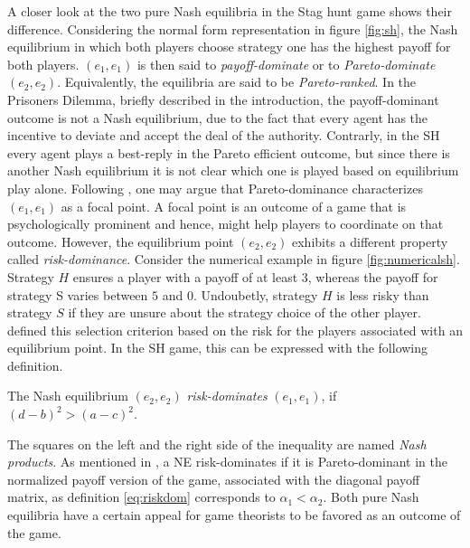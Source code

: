 A closer look at the two pure Nash equilibria in the Stag hunt game 
shows their difference. Considering the normal form representation in figure 
\ref{fig:sh}, the Nash equilibrium in which both players choose strategy one 
has the highest payoff
for both players. $(e_1,e_1)$ is then said to 
\textit{payoff-dominate} or to \textit{Pareto-dominate} 
$(e_2,e_2)$. Equivalently, the equilibria are said to be
\textit{Pareto-ranked}.
In the Prisoners Dilemma, briefly described in the introduction, 
the payoff-dominant outcome is not a 
Nash equilibrium, due to the fact that every agent has the incentive to 
deviate and accept the deal of the authority.
Contrarly, in the SH every agent plays a best-reply 
in the Pareto efficient outcome, but since there is another Nash equilibrium 
it is not clear which one is played based on equilibrium play alone. 
Following \textcite[57]{schelling_strategy_1960}, one may argue that 
Pareto-dominance characterizes $(e_1,e_1)$ as a focal point. 
A focal point is an outcome of a game that is psychologically prominent and
hence, might help players to coordinate on that outcome.
However, the equilibrium point $(e_2,e_2)$ exhibits a different property
called \textit{risk-dominance}. 
Consider the numerical example in figure \ref{fig:numericalsh}. 
Strategy $H$ ensures a player with a payoff of at least $3$, whereas the 
payoff for strategy S varies between $5$ and $0$. Undoubetly, 
strategy $H$ is less risky than strategy $S$ if they are unsure 
about the strategy choice of the other player.
\textcite{harsanyi_general_1988} defined this selection criterion 
based on the risk for the players associated with an 
equilibrium point. In the SH game, this can be expressed with the following
definition.
\begin{mydef}
The Nash equilibrium $(e_2,e_2)$ \textit{risk-dominates} 
$(e_1,e_1)$, if $(d-b)^2 > (a-c)^2$. \label{eq:riskdom}
 \end{mydef}
The squares on the left and the right side of the inequality are named
\textit{Nash products}.
As mentioned in \textcite{weibull_evolutionary_1997}, a NE risk-dominates 
if it is Pareto-dominant in the normalized payoff version of the game, 
associated with the diagonal payoff matrix, 
as definition \eqref{eq:riskdom} corresponds to $\alpha_1 < \alpha_2$.
Both pure Nash equilibria have a certain appeal for game theorists to be
favored as an outcome of the game. 

